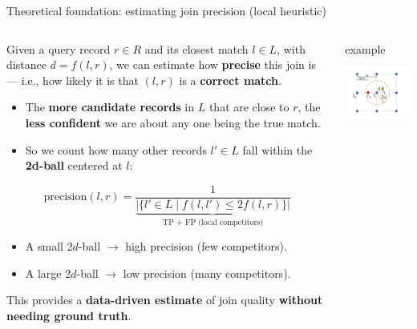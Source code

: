 \documentclass[8pt]{beamer} %
\begin{document}
\begin{frame}{Theoretical foundation: estimating join precision (local heuristic)}
	\begin{columns}
		\begin{column}{0.4\textwidth}
			Given a query record $r \in R$ and its closest match $l \in L$, with distance $d = f(l, r)$, we can estimate how \textbf{precise} this join is — i.e., how likely it is that $(l, r)$ is a \textbf{correct match}.
			

			\begin{itemize}
				\item The \textbf{more candidate records} in $L$ that are close to $r$, the \textbf{less confident} we are about any one being the true match.
				\item So we count how many other records $l' \in L$ fall within the \textbf{2d-ball} centered at $l$:
			\end{itemize}
			
			$$
			\text{precision}(l, r) =
			\frac{1}{
				\underbrace{|\{ l' \in L \mid f(l, l') \leq 2f(l, r) \}|}_{\text{TP + FP (local competitors)}}
			}
			$$
			
			\begin{itemize}
				\item A small 2$d$-ball $\rightarrow$ high precision (few competitors).
				\item A large 2$d$-ball $\rightarrow$ low precision (many competitors).
			\end{itemize}
			

			This provides a \textbf{data-driven estimate} of join quality \textbf{without needing ground truth}.
		\end{column}


		\begin{column}{0.4\textwidth}
			\begin{beamercolorbox}[rounded=true, shadow=true, leftskip=1em, rightskip=1em]{example}		
				
				\centering
				\includegraphics[width=0.7\linewidth]{img/Pasted image 20250331211545.png}
				

\end{beamercolorbox}
\end{column}
\end{columns}
\end{frame}
\end{document}
